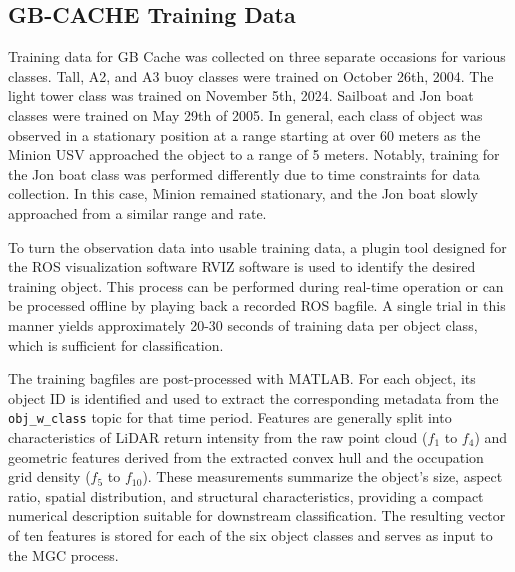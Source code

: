 \documentclass{erauthesis}
\begin{document}




\subsection{GB-CACHE Training Data} \label{training_data_gbcache}

Training data for GB Cache was collected on three separate occasions for various classes. Tall, A2, and A3 buoy classes were trained on October 26th, 2004. The light tower class was trained on November 5th, 2024. Sailboat and Jon boat classes were trained on May 29th of 2005. In general, each class of object was observed in a stationary position at a range starting at over 60 meters as the Minion \ac{USV} approached the object to a range of 5 meters. 
Notably, training for the Jon boat class was performed differently due to time constraints for data collection.
In this case, Minion remained stationary, and the Jon boat slowly approached from a similar range and rate.

To turn the observation data into usable training data, a plugin tool designed for the ROS visualization software RVIZ software is used to identify the desired training object. This process can be performed during real-time operation or can be processed offline by playing back a recorded ROS bagfile.
A single trial in this manner yields approximately 20-30 seconds of training data per object class, which is sufficient for classification.



The training bagfiles are post-processed with MATLAB. 
For each object, its object ID is identified and used to extract the corresponding metadata from the \texttt{obj\_w\_class} topic for that time period. 
Features are generally split into characteristics of LiDAR return intensity from the raw point cloud ($f_1$ to $f_4$) and geometric features derived from the extracted convex hull and the occupation grid density ($f_5$ to $f_{10}$).
These measurements summarize the object's size, aspect ratio, spatial distribution, and structural characteristics, providing a compact numerical description suitable for downstream classification. The resulting vector of ten features is stored for each of the six object classes and serves as input to the \ac{MGC} process.
\end{document}

